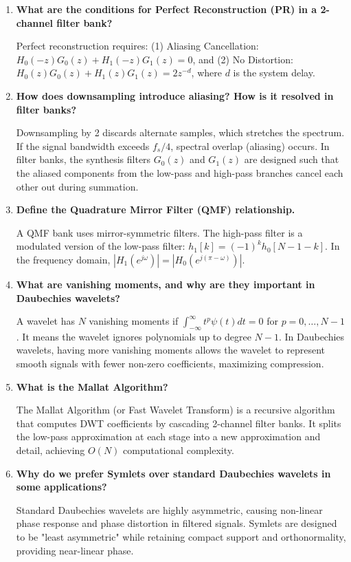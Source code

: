 \documentclass[12pt,a4paper]{article}
\newcommand{\Q}[1]{\textbf{#1}\par\noindent\ignorespaces}
\begin{document}
\begin{tcolorbox}[exambox, title={\textbf{Frequently Asked / Viva Questions}}]
\begin{enumerate}[topsep=0pt, label=\textbf{Q\arabic*.}, itemsep=5pt]
  \item \Q{What are the conditions for Perfect Reconstruction (PR) in a 2-channel filter bank?}
        Perfect reconstruction requires: (1) Aliasing Cancellation: $H_0(-z)G_0(z) + H_1(-z)G_1(z) = 0$, and (2) No Distortion: $H_0(z)G_0(z) + H_1(z)G_1(z) = 2z^{-d}$, where $d$ is the system delay.

  \item \Q{How does downsampling introduce aliasing? How is it resolved in filter banks?}
        Downsampling by 2 discards alternate samples, which stretches the spectrum. If the signal bandwidth exceeds $f_s/4$, spectral overlap (aliasing) occurs. In filter banks, the synthesis filters $G_0(z)$ and $G_1(z)$ are designed such that the aliased components from the low-pass and high-pass branches cancel each other out during summation.

  \item \Q{Define the Quadrature Mirror Filter (QMF) relationship.}
        A QMF bank uses mirror-symmetric filters. The high-pass filter is a modulated version of the low-pass filter: $h_1[k] = (-1)^k h_0[N - 1 - k]$. In the frequency domain, $|H_1(e^{j\omega})| = |H_0(e^{j(\pi - \omega)})|$.

  \item \Q{What are vanishing moments, and why are they important in Daubechies wavelets?}
        A wavelet has $N$ vanishing moments if $\int_{-\infty}^{\infty} t^p \psi(t) dt = 0$ for $p = 0, \dots, N-1$. It means the wavelet ignores polynomials up to degree $N-1$. In Daubechies wavelets, having more vanishing moments allows the wavelet to represent smooth signals with fewer non-zero coefficients, maximizing compression.

  \item \Q{What is the Mallat Algorithm?}
        The Mallat Algorithm (or Fast Wavelet Transform) is a recursive algorithm that computes DWT coefficients by cascading 2-channel filter banks. It splits the low-pass approximation at each stage into a new approximation and detail, achieving $O(N)$ computational complexity.

  \item \Q{Why do we prefer Symlets over standard Daubechies wavelets in some applications?}
        Standard Daubechies wavelets are highly asymmetric, causing non-linear phase response and phase distortion in filtered signals. Symlets are designed to be "least asymmetric" while retaining compact support and orthonormality, providing near-linear phase.
\end{enumerate}
\end{tcolorbox}
\end{document}
